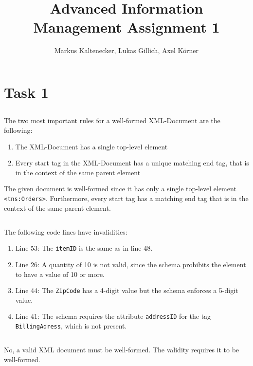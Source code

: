 \documentclass{article}
\title{Advanced Information Management Assignment 1 }
\author{Markus Kaltenecker, Lukas Gillich, Axel Körner}
\begin{document}
\maketitle

\section{Task 1}

\subsection{}
The two most important rules for a well-formed XML-Document are the following:

\begin{enumerate}
\item The XML-Document has a single top-level element
\item Every start tag in the XML-Document has a unique matching end tag, that is in the context of the same parent element
\end{enumerate}
The given document is well-formed since it has only a single top-level element \texttt{<tns:Orders>}. Furthermore, every start tag has a matching end tag that is in the context of the same parent element.

\subsection{}
The following code lines have invalidities:
\begin{enumerate}
    \item Line 53: The \texttt{itemID} is the same as in line 48.
    \item Line 26: A quantity of 10 is not valid, since the schema prohibits the element to have a value of 10 or more.
    \item Line 44: The \texttt{ZipCode} has a 4-digit value but the schema enforces a 5-digit value.
    \item Line 41: The schema requires the attribute \texttt{addressID} for the tag \texttt{BillingAdress}, which is not present.

\end{enumerate}

\subsection{}
No, a valid XML document must be well-formed. The validity requires it to be well-formed.
\end{document}
